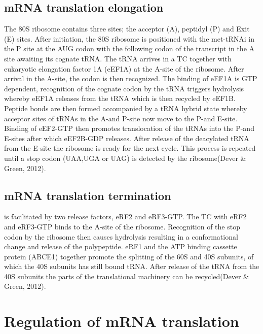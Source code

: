 \documentclass[12pt,openany]{book}
\begin{document}
\subsection{mRNA translation elongation}

The 80S ribosome contains three sites; the acceptor (A), peptidyl (P)
and Exit (E) sites. After initiation, the 80S ribosome is positioned
with the met-tRNAi in the P site at the AUG codon with the following
codon of the transcript in the A site awaiting its cognate tRNA. The
tRNA arrives in a TC together with eukaryotic elongation factor 1A
(eEF1A) at the A-site of the ribosome. After arrival in the A-site, the
codon is then recognized. The binding of eEF1A is GTP dependent,
recognition of the cognate codon by the tRNA triggers hydrolysis whereby
eEF1A releases from the tRNA which is then recycled by eEF1B. Peptide
bonds are then formed accompanied by a tRNA hybrid state whereby
acceptor sites of tRNAs in the A-and P-site now move to the P-and
E-site. Binding of eEF2-GTP then promotes translocation of the tRNAs
into the P-and E-sites after which eEF2B-GDP releases. After release of
the deacylated tRNA from the E-site the ribosome is ready for the next
cycle. This process is repeated until a stop codon (UAA,UGA or UAG) is
detected by the ribosome(Dever \& Green, 2012).

\subsection{mRNA translation termination}

is facilitated by two release factors, eRF2 and eRF3-GTP. The TC with
eRF2 and eRF3-GTP binds to the A-site of the ribosome. Recognition of
the stop codon by the ribosome then causes hydrolysis resulting in a
conformational change and release of the polypeptide. eRF1 and the ATP
binding cassette protein (ABCE1) together promote the splitting of the
60S and 40S subunits, of which the 40S subunits has still bound tRNA.
After release of the tRNA from the 40S subunits the parts of the
translational machinery can be recycled(Dever \& Green, 2012).

\section{Regulation of mRNA translation}
\end{document}
